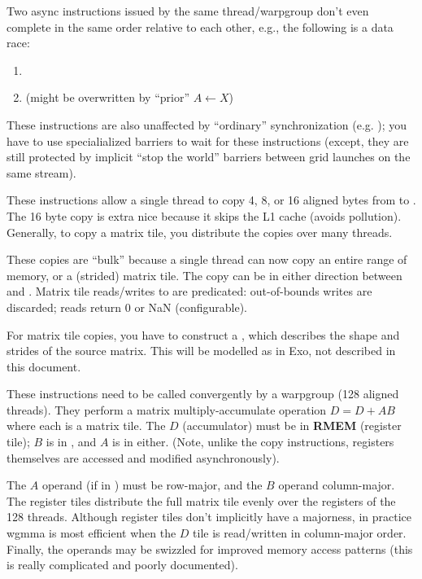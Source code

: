 \filbreak
Two async instructions issued by the same thread/warpgroup don't even complete in the same order relative to each other, e.g., the following is a data race:
\begin{enumerate}
  \item {}
  \item {} (might be overwritten by ``prior'' $A \leftarrow X$)
\end{enumerate}

\filbreak
These instructions are also unaffected by ``ordinary'' synchronization (e.g. );
you have to use specialialized barriers to wait for these instructions
(except, they are still protected by implicit ``stop the world'' barriers between grid launches on the same stream).

\filbreak
{}

These instructions allow a single thread to copy 4, 8, or 16 aligned bytes from  to .
The 16 byte copy is extra nice because it skips the L1 cache (avoids pollution).
Generally, to copy a matrix tile, you distribute the copies over many threads.

\filbreak
{}
These copies are ``bulk'' because a single thread can now copy an entire range of memory, or a (strided) matrix tile.
The copy can be in either direction between  and .
Matrix tile reads/writes to  are predicated: out-of-bounds writes are discarded; reads return 0 or NaN (configurable).

\filbreak
For matrix tile copies, you have to construct a , which describes the shape and strides of the source matrix.
This will be modelled as  in Exo, not described in this document.

\filbreak
{}
These instructions need to be called convergently by a warpgroup (128 aligned threads).
They perform a matrix multiply-accumulate operation $D = D + AB$ where each is a matrix tile.
The $D$ (accumulator) must be in \textbf{RMEM} (register tile); $B$ is in , and $A$ is in either.
(Note, unlike the copy instructions, registers themselves are accessed and modified asynchronously).

\filbreak
The $A$ operand (if in ) must be row-major, and the $B$ operand column-major.
The register tiles distribute the full matrix tile evenly over the registers of the 128 threads.
Although register tiles don't implicitly have a majorness, in practice wgmma is most efficient when the $D$ tile is read/written in column-major order.
Finally, the  operands may be swizzled for improved memory access patterns (this is really complicated and poorly documented).


\filbreak
{}


